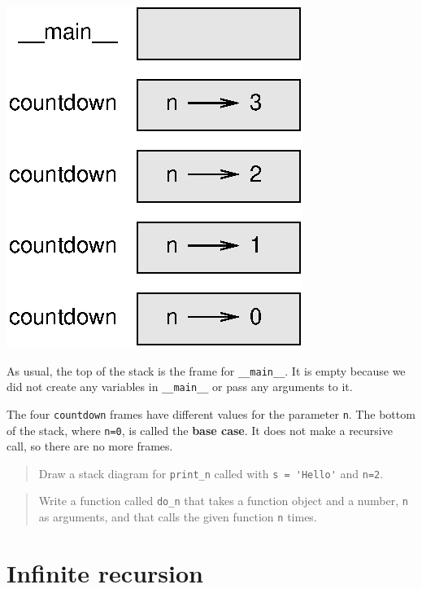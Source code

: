 \documentclass[10pt]{book}
\begin{document}
\beforefig
\centerline{\includegraphics{figs/stack2.eps}}
\afterfig

As usual, the top of the stack is the frame for \verb"__main__".
It is empty because we did not create any variables in 
\verb"__main__" or pass any arguments to it.


The four {\tt countdown} frames have different values for the
parameter {\tt n}.  The bottom of the stack, where {\tt n=0}, is
called the {\bf base case}.  It does not make a recursive call, so
there are no more frames.

\begin{quote}
Draw a stack diagram for \verb"print_n" called with
\verb"s = 'Hello'" and {\tt n=2}.
\end{quote}

\begin{quote}
Write a function called \verb"do_n" that takes a function
object and a number, {\tt n} as arguments, and that calls
the given function {\tt n} times.
\end{quote}



\section{Infinite recursion}
\end{document}
